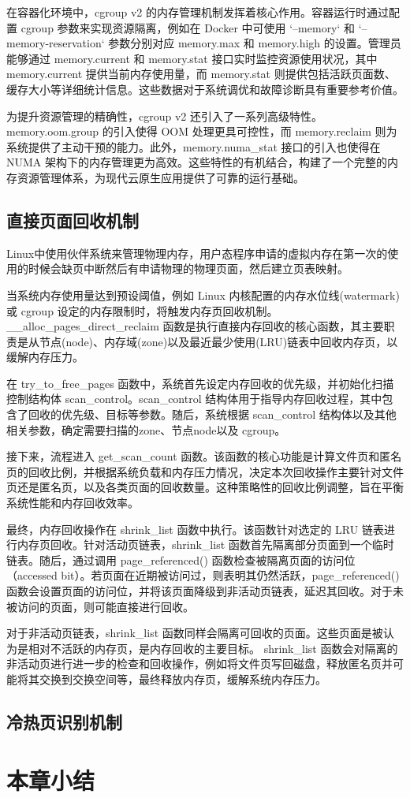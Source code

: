在容器化环境中，cgroup v2 的内存管理机制发挥着核心作用。容器运行时通过配置 cgroup 参数来实现资源隔离，例如在 Docker 中可使用 `--memory` 和 `--memory-reservation` 参数分别对应 memory.max 和 memory.high 的设置。管理员能够通过 memory.current 和 memory.stat 接口实时监控资源使用状况，其中 memory.current 提供当前内存使用量，而 memory.stat 则提供包括活跃页面数、缓存大小等详细统计信息。这些数据对于系统调优和故障诊断具有重要参考价值。

为提升资源管理的精确性，cgroup v2 还引入了一系列高级特性。memory.oom.group 的引入使得 OOM 处理更具可控性，而 memory.reclaim 则为系统提供了主动干预的能力。此外，memory.numa\_stat 接口的引入也使得在 NUMA 架构下的内存管理更为高效。这些特性的有机结合，构建了一个完整的内存资源管理体系，为现代云原生应用提供了可靠的运行基础。

\subsection{直接页面回收机制}
\label{sec:直接页面回收机制}

Linux中使用伙伴系统来管理物理内存，用户态程序申请的虚拟内存在第一次的使用的时候会缺页中断然后有申请物理的物理页面，然后建立页表映射。

当系统内存使用量达到预设阈值，例如 Linux 内核配置的内存水位线(watermark)或 cgroup 设定的内存限制时，将触发内存页回收机制。\_\_alloc\_pages\-\_direct\_reclaim
函数是执行直接内存回收的核心函数，其主要职责是从节点(node)、内存域(zone)以及最近最少使用(LRU)链表中回收内存页，以缓解内存压力。

在 try\_to\_free\_pages 函数中，系统首先设定内存回收的优先级，并初始化扫描控制结构体 scan\_control。scan\_control 结构体用于指导内存回收过程，其中包含了回收的优先级、目标等参数。随后，系统根据 scan\_control 结构体以及其他相关参数，确定需要扫描的zone、节点node以及 cgroup。

接下来，流程进入 get\_scan\_count 函数。该函数的核心功能是计算文件页和匿名页的回收比例，并根据系统负载和内存压力情况，决定本次回收操作主要针对文件页还是匿名页，以及各类页面的回收数量。这种策略性的回收比例调整，旨在平衡系统性能和内存回收效率。

最终，内存回收操作在 shrink\_list 函数中执行。该函数针对选定的 LRU 链表进行内存页回收。针对活动页链表，shrink\_list 函数首先隔离部分页面到一个临时链表。随后，通过调用 page\_referenced() 函数检查被隔离页面的访问位（accessed bit）。若页面在近期被访问过，则表明其仍然活跃，page\_referenced() 函数会设置页面的访问位，并将该页面降级到非活动页链表，延迟其回收。对于未被访问的页面，则可能直接进行回收。

对于非活动页链表，shrink\_list 函数同样会隔离可回收的页面。这些页面是被认为是相对不活跃的内存页，是内存回收的主要目标。 shrink\_list 函数会对隔离的非活动页进行进一步的检查和回收操作，例如将文件页写回磁盘，释放匿名页并可能将其交换到交换空间等，最终释放内存页，缓解系统内存压力。

\subsection{冷热页识别机制}

\section{本章小结}